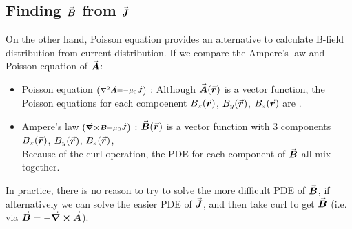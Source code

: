 \documentclass[class=article, crop=false, 12pt]{standalone}
\begin{document}
\subsection{Finding $\va*{B}$ from $\va*{J}$}

On the other hand, Poisson equation provides an alternative to calculate B-field distribution from current distribution.
If we compare the Ampere's law and Poisson equation of $\va*{A}$:
\begin{itemize}
    \item \ul{Poisson equation} $\scriptstyle \qty(\laplacian \vvec{A} = -{\mu_0 \vvec{J}})$ : 
    Although $\va*{A}(\va*{r})$ is a vector function,
    the Poisson equations for each compoenent $B_x(\va*{r})$, $B_y(\va*{r})$, $B_z(\va*{r})$ 
    are .

    \item \ul{Ampere's law} $\scriptstyle \qty(\curl \va*{B} = \mu_0 \va*{J})$ : 
    $\va*{B}(\va*{r})$ is a vector function with 3 components $B_x(\va*{r})$, $B_y(\va*{r})$, $B_z(\va*{r})$,\\
    Because of the curl operation, 
    the PDE for each component of $\va*{B}$ all mix together.

\end{itemize}

In practice, there is no reason to try to solve the more difficult PDE of $\va*{B}$,
if alternatively we can solve the easier PDE of $\va*{J}$,
and then take curl to get $\va*{B}$ (i.e. via $\va*{B} = -\curl \va*{A}$). 

\end{document}
